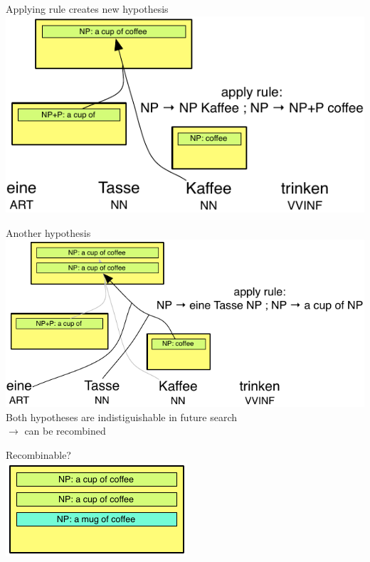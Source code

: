\documentclass[landscape]{slides}
\begin{document}

\begin{center}\vspace{10mm}
Applying rule creates new hypothesis\\[15mm]
\includegraphics[scale=1.5]{chart-recombination.pdf}
\end{center}


\begin{center}\vspace{5mm}
Another hypothesis\\[10mm]
\includegraphics[scale=1.5]{chart-recombination2.pdf}\\[10mm]
Both hypotheses are indistiguishable in future search\\
$\rightarrow$ can be recombined
\end{center}


\begin{center} \vspace{10mm}
Recombinable?\\[10mm]
\includegraphics[scale=3]{chart-recombination3.pdf}
\end{center}
\end{document}
